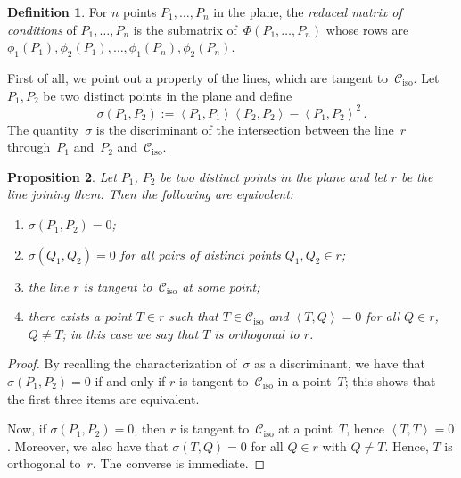 \documentclass[11pt, a4paper, reqno, captions=tableheading,bibliography=totoc]{scrartcl}
\theoremstyle{plain}
\newtheorem{lemma}{Lemma}[section]
\newtheorem{prop}[lemma]{Proposition}
\theoremstyle{definition}
\newtheorem{definition}[lemma]{Definition}
\newcommand{\iso}{\mathcal{C}_{\mathrm{iso}}}
\newcommand{\scl}[2]{\left\langle {#1}, {#2} \right\rangle}
\begin{document}
\begin{definition}
 \label{definition:reduced_matrix_conditions}
 For $n$ points $P_1, \dotsc, P_n$ in the plane, the \emph{reduced matrix of conditions} of $P_1, \dotsc, P_n$ is the submatrix of~$\Phi(P_1, \dotsc, P_n)$ whose rows are $\phi_1(P_1), \phi_2(P_1), \dotsc, \phi_1(P_n), \phi_2(P_n)$.
\end{definition}




First of all, we point out a property of the lines, which are tangent to~$\iso$.
Let $P_1, P_2$ be two distinct points in the plane and define
%
\[
  \sigma(P_1, P_2) := \scl{P_1}{P_1} \scl{P_2}{P_2} - \scl{P_1}{P_2}^2 \,.
\]
%
The quantity~$\sigma$ is the discriminant of the intersection between the line~$r$ through~$P_1$ and~$P_2$ and~$\iso$.

\begin{prop}
\label{proposition:sigma_tangency}
  Let $P_1$, $P_2$ be two distinct points in the plane and let $r$ be the line joining them.
  Then the following are equivalent:
  \begin{enumerate}
  \item $\sigma(P_1, P_2) = 0$;
  \item $\sigma(Q_1, Q_2) = 0$ for all pairs of distinct points $Q_1, Q_2 \in r$;
  \item the line $r$ is tangent to~$\iso$ at some point;
  \item there exists a point $T \in r$ such that  $T \in \iso$ and $\scl{T}{Q} = 0$ for all $Q \in r$, $Q \neq T$; in this case we say that $T$ is \emph{orthogonal} to $r$.
  \end{enumerate}
\end{prop}
\begin{proof}
  By recalling the characterization of~$\sigma$ as a discriminant, we have that $\sigma(P_1, P_2) = 0$ if and only if $r$ is tangent to~$\iso$ in a point~$T$; this shows that the first three items are equivalent.

  Now, if $\sigma(P_1, P_2) = 0$, then $r$ is tangent to~$\iso$ at a point~$T$, hence $\scl{T}{T} = 0$. Moreover, we also have that $\sigma(T, Q) = 0$ for all $Q \in r$ with $Q \neq T$. Hence, $T$ is orthogonal to~$r$.
  The converse is immediate.
\end{proof}
\end{document}
